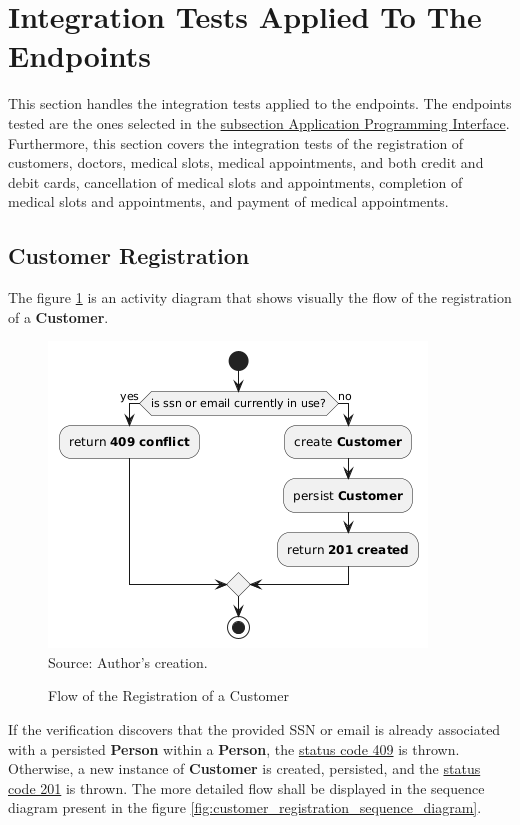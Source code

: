 \section{Integration Tests Applied To The Endpoints}

This section handles the integration tests applied to the endpoints. The endpoints tested are the ones selected in the \hyperref[subsection:api]{subsection Application Programming Interface}. Furthermore, this section covers the integration tests of the registration of customers, doctors, medical slots, medical appointments, and both credit and debit cards, cancellation of medical slots and appointments, completion of medical slots and appointments, and payment of medical appointments.

\subsection{Customer Registration}

The figure \ref{fig:customer_registration_flow} is an activity diagram that shows visually the flow of the registration of a \textbf{Customer}.

\begin{figure}[H]
	\centering
	\caption{Flow of the Registration of a Customer}
	\includegraphics[width=1\linewidth]{figures/customer_registration_activity_diagram.png}
	\label{fig:customer_registration_flow}
	\footnotesize Source: Author's creation.
\end{figure}

If the verification discovers that the provided SSN or email is already associated with a persisted \textbf{Person} within a \textbf{Person}, the \hyperref[tab:summary_http_status_codes]{status code 409} is thrown. Otherwise, a new instance of \textbf{Customer} is created,  persisted, and the \hyperref[tab:summary_http_status_codes]{status code 201} is thrown. The more detailed flow shall be displayed in the sequence diagram present in the figure \ref{fig:customer_registration_sequence_diagram}.

